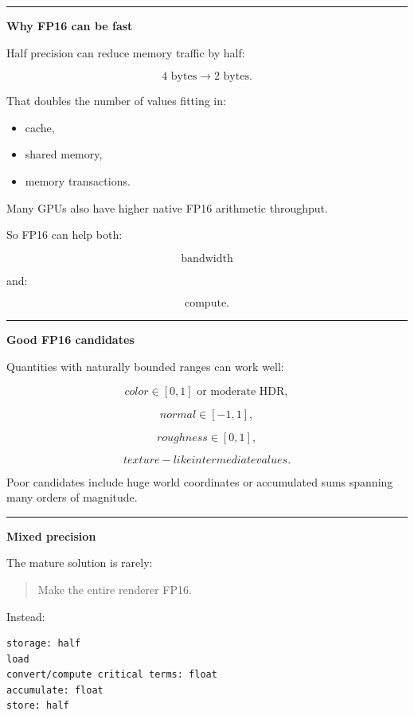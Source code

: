 \begin{center}\rule{0.5\linewidth}{0.5pt}\end{center}

\textbf{Why FP16 can be fast}

Half precision can reduce memory traffic by half:

\[
4\text{ bytes}
\rightarrow
2\text{ bytes}.
\]

That doubles the number of values fitting in:

\begin{itemize}
\tightlist
\item
  cache,
\item
  shared memory,
\item
  memory transactions.
\end{itemize}

Many GPUs also have higher native FP16 arithmetic throughput.

So FP16 can help both:

\[
\text{bandwidth}
\]

and:

\[
\text{compute}.
\]

\begin{center}\rule{0.5\linewidth}{0.5pt}\end{center}

\textbf{Good FP16 candidates}

Quantities with naturally bounded ranges can work well:

\[
color\in[0,1]\text{ or moderate HDR},
\]

\[
normal\in[-1,1],
\]

\[
roughness\in[0,1],
\]

\[
texture-like intermediate values.
\]

Poor candidates include huge world coordinates or accumulated sums spanning many orders of magnitude.

\begin{center}\rule{0.5\linewidth}{0.5pt}\end{center}

\textbf{Mixed precision}

The mature solution is rarely:

\begin{quote}
Make the entire renderer FP16.
\end{quote}

Instead:

\protect{}\label{p10-mixed}%
\begin{verbatim}
storage: half
load
convert/compute critical terms: float
accumulate: float
store: half
\end{verbatim}

